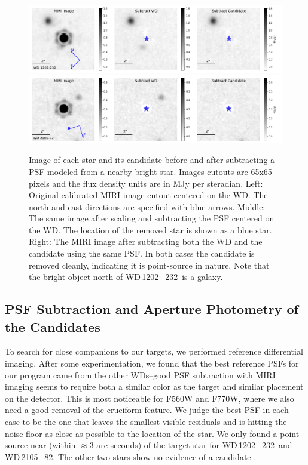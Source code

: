 \documentclass[twocolumn]{aastex631}
\newcommand{\wdA}{WD\,1202$-$232}
\newcommand{\wdB}{WD\,2105$-$82}
\begin{document}

\begin{figure}
    \centering
    \includegraphics[scale=0.45]{wd1202_subcand_f1500w_compass_v3.png}
    \includegraphics[scale=0.45]{wd2105_subcand_f1500w_compass_v3.png}
    \caption{Image of each star and its candidate before and after subtracting a PSF modeled from a nearby bright star. Images cutouts are 65x65 pixels and the flux density units are in MJy per steradian. Left: Original calibrated MIRI image cutout centered on the WD. The north and east directions are specified with blue arrows.  Middle: The same image after scaling and subtracting the PSF centered on the WD. The location of the removed star is shown as a blue star. Right: The MIRI image after subtracting both the WD and the candidate using the same PSF. In both cases the candidate is removed cleanly, indicating it is point-source in nature. Note that the bright object north of \wdA\ is a galaxy. }
    \label{fig:psf}
\end{figure}

\subsection{PSF Subtraction and Aperture Photometry of the Candidates}
To search for close companions to our targets, we performed reference differential imaging. After some experimentation, we found that the best reference PSFs for our program came from the other WDs--good PSF subtraction with MIRI imaging seems to require both a similar color as the target and similar placement on the detector. This is most noticeable for F560W and F770W, where we also need a good removal of the cruciform feature. We judge the best PSF in each case to be the one that leaves the smallest visible residuals and is hitting the noise floor as close as possible to the location of the star. We only found a point source near (within $\approx$3 arc seconds) of the target star for \wdA\ and \wdB. The other two stars show no evidence of a candidate \citep[for WD2149+021 see][]{Poulsen2023}. 
\end{document}
